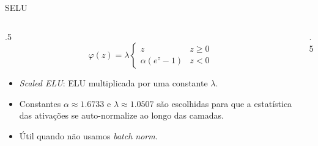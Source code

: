 \documentclass[aspectratio=169,xcolor=dvipsnames]{beamer}
\begin{document}
  \begin{frame}{SELU}
    \begin{columns}
      \begin{column}{.5\linewidth}
        \[
          \varphi(z) = \lambda
            \begin{cases}
              z & z\ge 0 \\
              \alpha(e^{z}-1) & z<0
            \end{cases}
        \]
        \begin{itemize}
          \item \textit{Scaled ELU}: ELU multiplicada por uma constante $\lambda$.
          \item Constantes $\alpha\approx 1.6733$ e $\lambda\approx 1.0507$ são escolhidas
            para que a estatística das ativações se auto-normalize ao longo das camadas.
          \item Útil quando não usamos \textit{batch norm}.
        \end{itemize}
      \end{column}
      \begin{column}{.5\linewidth}
        \centering
      \end{column}
    \end{columns}
  \end{frame}
\end{document}
